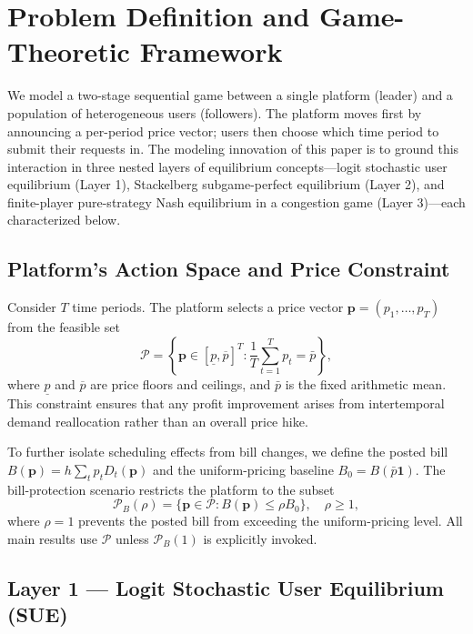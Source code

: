 \documentclass[11pt]{article}
\newcommand{\pcap}{\bar p}
\newcommand{\D}{D}
\begin{document}
\section{Problem Definition and Game-Theoretic Framework}
\label{sec:model}

We model a two-stage sequential game between a single platform (leader) and
a population of heterogeneous users (followers). The platform moves first
by announcing a per-period price vector; users then choose which time period
to submit their requests in. The modeling innovation of this paper is to
ground this interaction in three nested layers of equilibrium
concepts---logit stochastic user equilibrium (Layer 1),
Stackelberg subgame-perfect equilibrium (Layer 2), and finite-player pure-strategy Nash equilibrium
in a congestion game (Layer 3)---each characterized below.

\subsection{Platform's Action Space and Price Constraint}

Consider $T$ time periods. The platform selects a price vector
$\boldsymbol{p}=(p_1,\ldots,p_T)$ from the feasible set
\begin{equation}
  \mathcal{P} =
  \left\{\boldsymbol{p}\in[\underline p,\overline p]^T:
  \frac{1}{T}\sum_{t=1}^{T}p_t=\pcap\right\},
  \label{eq:feasible}
\end{equation}
where $\underline p$ and $\overline p$ are price floors and ceilings, and
$\pcap$ is the fixed arithmetic mean. This constraint ensures that any
profit improvement arises from intertemporal demand reallocation rather
than an overall price hike.

To further isolate scheduling effects from bill changes, we define the
posted bill $B(\boldsymbol{p})=h\sum_t p_t\D_t(\boldsymbol{p})$ and the
uniform-pricing baseline $B_0=B(\pcap\boldsymbol{1})$. The bill-protection
scenario restricts the platform to the subset
\begin{equation}
  \mathcal{P}_B(\rho)=
  \{\boldsymbol{p}\in\mathcal{P}:B(\boldsymbol{p})\leq \rho B_0\},\quad \rho\geq 1,
  \label{eq:bill_protection}
\end{equation}
where $\rho=1$ prevents the posted bill from exceeding the uniform-pricing
level. All main results use $\mathcal{P}$ unless $\mathcal{P}_B(1)$ is
explicitly invoked.

\subsection{Layer 1 --- Logit Stochastic User Equilibrium (SUE)}
\end{document}
